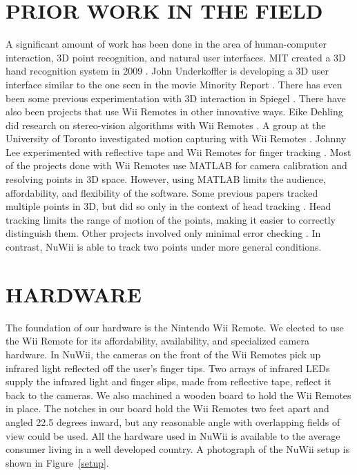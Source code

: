 \documentclass[a4paper,twoside]{article}
\begin{document}
\section{\uppercase{Prior Work in the Field}} \noindent  A significant amount
of work has been done in the area of human-computer interaction, 3D point
recognition, and natural user interfaces. MIT created a 3D hand recognition
system in 2009 \cite{Wang09}. John Underkoffler is developing a 3D user
interface similar to the one seen in the movie Minority Report
\cite{Underkoffler10}. There has even been some previous experimentation with
3D interaction in Spiegel \cite{Bak04}. There have also been projects that use
Wii Remotes in other innovative ways. Eike Dehling did research on
stereo-vision algorithms with Wii Remotes \cite{Dehling08}. A group at the
University of Toronto investigated motion capturing with Wii Remotes
\cite{Wang08}. Johnny Lee experimented with reflective tape and Wii Remotes for
finger tracking  \cite{Lee08}. Most of the projects done with Wii Remotes use
MATLAB for camera calibration and resolving points in 3D space. However, using
MATLAB limits the audience, affordability, and flexibility of the software.
Some previous papers tracked multiple points in 3D, but did so only in the
context of head tracking \cite{Cuypers09}. Head tracking limits the range of
motion of the points, making it easier to correctly distinguish them.
Other projects involved only minimal error checking \cite{Hay08}. In contrast, NuWii is able to track two points under more general
conditions.
 
\section{\uppercase{Hardware}} \noindent The foundation of our hardware is the
Nintendo Wii Remote. We elected to use the Wii Remote for its affordability,
availability, and specialized camera hardware. In NuWii, the cameras on the
front of the Wii Remotes pick up infrared light reflected off the user's finger
tips. Two arrays of infrared LEDs supply the infrared light and finger slips,
made from reflective tape, reflect it back to the cameras. We also machined a
wooden board to hold the Wii Remotes in place. The notches in our board hold the
Wii Remotes two feet apart and angled 22.5 degrees inward, but any reasonable
angle with overlapping fields of view could be used. All the hardware used in
NuWii is available to the average consumer living in a well developed country.
A photograph of the NuWii setup is shown in Figure~\ref{setup}. 
\end{document}
